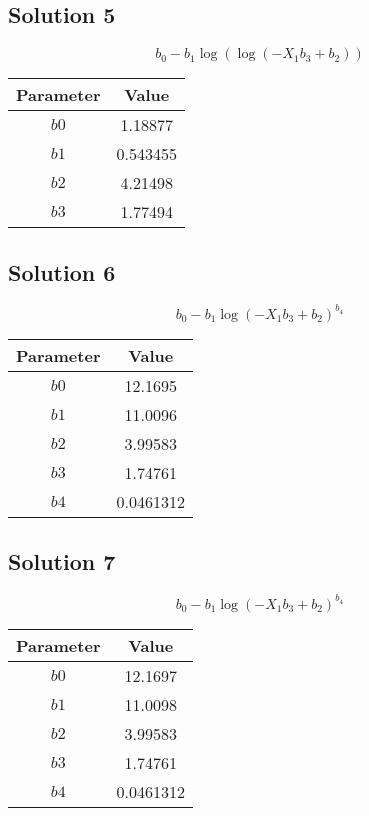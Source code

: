 \documentclass{article}
\begin{document}
\vspace{1em}
\subsection*{Solution 5}
\[
b_{0} - b_{1} \log{\left(\log{\left(- X_{1} b_{3} + b_{2} \right)} \right)}
\]
\begin{center}
\begin{tabular}{cc}
\toprule
Parameter & Value \\
\midrule
$b0$ & 1.18877 \\
$b1$ & 0.543455 \\
$b2$ & 4.21498 \\
$b3$ & 1.77494 \\
\bottomrule
\end{tabular}
\end{center}

\vspace{1em}
\subsection*{Solution 6}
\[
b_{0} - b_{1} \log{\left(- X_{1} b_{3} + b_{2} \right)}^{b_{4}}
\]
\begin{center}
\begin{tabular}{cc}
\toprule
Parameter & Value \\
\midrule
$b0$ & 12.1695 \\
$b1$ & 11.0096 \\
$b2$ & 3.99583 \\
$b3$ & 1.74761 \\
$b4$ & 0.0461312 \\
\bottomrule
\end{tabular}
\end{center}

\vspace{1em}
\subsection*{Solution 7}
\[
b_{0} - b_{1} \log{\left(- X_{1} b_{3} + b_{2} \right)}^{b_{4}}
\]
\begin{center}
\begin{tabular}{cc}
\toprule
Parameter & Value \\
\midrule
$b0$ & 12.1697 \\
$b1$ & 11.0098 \\
$b2$ & 3.99583 \\
$b3$ & 1.74761 \\
$b4$ & 0.0461312 \\
\bottomrule
\end{tabular}
\end{center}
\end{document}
